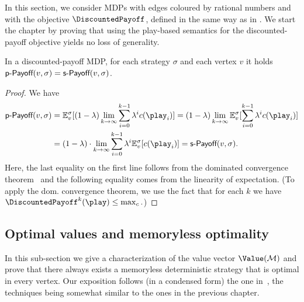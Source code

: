 In this section, we consider MDPs with edges coloured by rational numbers 
and with the objective $\DiscountedPayoff$, defined in the same way as in 
. We start the chapter by proving that using the play-based semantics for the discounted-payoff objective yields no loss of generality. 

\begin{lemma}
	\label{5-lem:disc-step-one}
In a discounted-payoff MDP, for each strategy $ \sigma $ and each vertex $ v $ it holds $ \textsf{p-Payoff}(v, \sigma) = \textsf{s-Payoff}(v, \sigma) $.
\end{lemma}
\begin{proof}
We have 
\begin{align*} \playPay(v,\sigma) &= \expv^\sigma_v[(1-\lambda)\lim_{k \rightarrow \infty} \sum_{i=0}^{k-1}\lambda^i \colouring(\play_i) ] = (1-\lambda) \lim_{k \rightarrow \infty} \expv^\sigma_v[\sum_{i=0}^{k-1}\lambda^i \colouring(\play_i) ] 
\\
&= (1-\lambda)\cdot\lim_{k \rightarrow \infty} \sum_{i=0}^{k-1}\lambda^i\expv^\sigma_v[ \colouring(\play_i) ] = \stepPay(v, \sigma).
\end{align*}
%
Here, the last equality on the first line follows from the dominated convergence theorem~\cite[Theorem 1.6.9]{Ash&Doleans-Dade:2000} and the following equality comes from the linearity of expectation. (To apply the dom. convergence 
theorem, we use the fact that for each 
$k$ we have $\DiscountedPayoff^{k}(\play)\leq \maxc.
$)
\end{proof}

\subsection*{Optimal values and memoryless optimality}

 In this sub-section we give a 
characterization of the value vector $\Value(\mdp)$ and prove that there always exists a 
memoryless deterministic strategy that is optimal in every vertex. Our 
exposition follows (in a condensed form) the one in~\cite{Puterman:2005}, the techniques 
being somewhat similar to the ones in the previous chapter.

%

